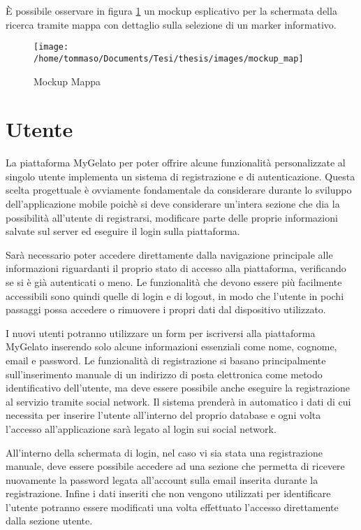 È possibile osservare in figura \ref{fig:Mockup-Mappa} un mockup
esplicativo per la schermata della ricerca tramite mappa con dettaglio
sulla selezione di un marker informativo.\bigskip{}

\begin{figure}[H]
\begin{centering}
\texttt{[image: /home/tommaso/Documents/Tesi/thesis/images/mockup\_map]}
\par\end{centering}
\caption{\label{fig:Mockup-Mappa}Mockup Mappa}

\end{figure}


\section{Utente}

La piattaforma MyGelato per poter offrire alcune funzionalità personalizzate
al singolo utente implementa un sistema di registrazione e di autenticazione.
Questa scelta progettuale è ovviamente fondamentale da considerare
durante lo sviluppo dell'applicazione mobile poichè si deve considerare
un'intera sezione che dia la possibilità all'utente di registrarsi,
modificare parte delle proprie informazioni salvate sul server ed
eseguire il login sulla piattaforma.

Sarà necessario poter accedere direttamente dalla navigazione principale
alle informazioni riguardanti il proprio stato di accesso alla piattaforma,
verificando se si è già autenticati o meno. Le funzionalità che devono
essere più facilmente accessibili sono quindi quelle di login e di
logout, in modo che l'utente in pochi passaggi possa accedere o rimuovere
i propri dati dal dispositivo utilizzato.\bigskip{}

I nuovi utenti potranno utilizzare un form per iscriversi alla piattaforma
MyGelato inserendo solo alcune informazioni essenziali come nome,
cognome, email e password. Le funzionalità di registrazione si basano
principalmente sull'inserimento manuale di un indirizzo di posta elettronica
come metodo identificativo dell'utente, ma deve essere possibile anche
eseguire la registrazione al servizio tramite social network. Il sistema
prenderà in automatico i dati di cui necessita per inserire l'utente
all'interno del proprio database e ogni volta l'accesso all'applicazione
sarà legato al login sui social network.\bigskip{}

All'interno della schermata di login, nel caso vi sia stata una registrazione
manuale, deve essere possibile accedere ad una sezione che permetta
di ricevere nuovamente la password legata all'account sulla email
inserita durante la registrazione. Infine i dati inseriti che non
vengono utilizzati per identificare l'utente potranno essere modificati
una volta effettuato l'accesso direttamente dalla sezione utente.

